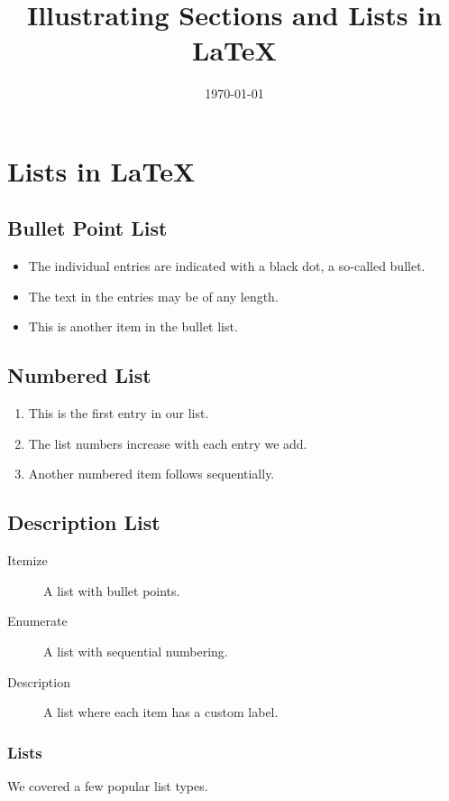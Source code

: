 \documentclass{article}
\title{Illustrating Sections and Lists in LaTeX}
\date{\today}
\begin{document}
\maketitle

\section{Lists in LaTeX}

\subsection{Bullet Point List}
\begin{itemize}
  \item The individual entries are indicated with a black dot, a so-called bullet.
  \item The text in the entries may be of any length.
  \item This is another item in the bullet list.
\end{itemize}

\subsection{Numbered List}
\begin{enumerate}
  \item This is the first entry in our list.
  \item The list numbers increase with each entry we add.
  \item Another numbered item follows sequentially.
\end{enumerate}

\subsection{Description List}
\begin{description}
  \item[Itemize] A list with bullet points.
  \item[Enumerate] A list with sequential numbering.
  \item[Description] A list where each item has a custom label.
\end{description}

\subsubsection{Lists}
We covered a few popular list types.
\end{document}
